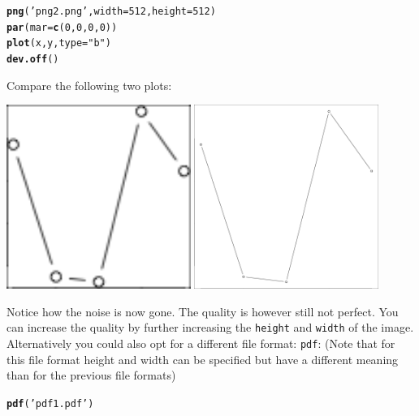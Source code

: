\documentclass{article}\usepackage[]{graphicx}\usepackage[]{color}
\makeatletter
\newcommand{\hlnum}[1]{\textcolor[rgb]{0.686,0.059,0.569}{#1}}%
\newcommand{\hlstr}[1]{\textcolor[rgb]{0.192,0.494,0.8}{#1}}%
\newcommand{\hlstd}[1]{\textcolor[rgb]{0.345,0.345,0.345}{#1}}%
\newcommand{\hlkwc}[1]{\textcolor[rgb]{0.333,0.667,0.333}{#1}}%
\newcommand{\hlkwd}[1]{\textcolor[rgb]{0.737,0.353,0.396}{\textbf{#1}}}%
\newenvironment{kframe}{%
 \def\at@end@of@kframe{}%
 \ifinner\ifhmode%
  \def\at@end@of@kframe{\end{minipage}}%
  \begin{minipage}{\columnwidth}%
 \fi\fi%
 \def\FrameCommand##1{\hskip\@totalleftmargin \hskip-\fboxsep
 \colorbox{shadecolor}{##1}\hskip-\fboxsep
     \hskip-\linewidth \hskip-\@totalleftmargin \hskip\columnwidth}%
 \MakeFramed {\advance\hsize-\width
   \@totalleftmargin\z@ \linewidth\hsize
   \@setminipage}}%
 {\par\unskip\endMakeFramed%
 \at@end@of@kframe}
\newenvironment{knitrout}{}{} %
\makeatother
\begin{document}
\begin{mdframed}
\begin{knitrout}
\begin{kframe}
\begin{alltt}
\hlkwd{png}\hlstd{(}\hlstr{'png2.png'}\hlstd{,}\hlkwc{width}\hlstd{=}\hlnum{512}\hlstd{,}\hlkwc{height}\hlstd{=}\hlnum{512}\hlstd{)}
\hlkwd{par}\hlstd{(}\hlkwc{mar}\hlstd{=}\hlkwd{c}\hlstd{(}\hlnum{0}\hlstd{,}\hlnum{0}\hlstd{,}\hlnum{0}\hlstd{,}\hlnum{0}\hlstd{))}
\hlkwd{plot}\hlstd{(x,y,}\hlkwc{type}\hlstd{=}\hlstr{"b"}\hlstd{)}
\hlkwd{dev.off}\hlstd{()}
\end{alltt}
\end{kframe}
\end{knitrout}
Compare the following two plots:
\begin{center}
\includegraphics[width=0.45\textwidth]{png1.png}
\includegraphics[width=0.45\textwidth]{png2.png}
\end{center}
Notice how the noise is now gone. The quality is however still not perfect. You can increase the quality by further increasing the \texttt{height} and \texttt{width} of the image. Alternatively you could also opt for a different file format: \texttt{pdf}: (Note that for this file format height and width can be specified but have a different meaning than for the previous file formats)
\begin{knitrout}
\color{fgcolor}\begin{kframe}
\begin{alltt}
\hlkwd{pdf}\hlstd{(}\hlstr{'pdf1.pdf'}\hlstd{)}

\end{alltt}
\end{kframe}
\end{knitrout}
\end{mdframed}
\end{document}
